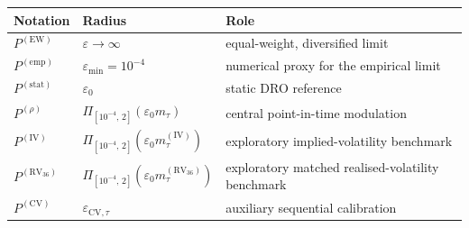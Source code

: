 \begin{tabular}{lll}
\toprule
Notation & Radius & Role \\
\midrule
\(P^{(\mathrm{EW})}\)
  & \(\varepsilon \to \infty\)
  & equal-weight, diversified limit \\

\(P^{(\mathrm{emp})}\)
  & \(\varepsilon_{\min}=10^{-4}\)
  & numerical proxy for the empirical limit \\

\(P^{(\mathrm{stat})}\)
  & \(\varepsilon_0\)
  & static DRO reference \\

\(P^{(\rho)}\)
  & \(\Pi_{[10^{-4},\,2]}(\varepsilon_0 m_\tau)\)
  & central point-in-time modulation \\
  
\(P^{(\mathrm{IV})}\)
  & \(\Pi_{[10^{-4},\,2]}(\varepsilon_0 m_\tau^{(\mathrm{IV})})\)
  & exploratory implied-volatility benchmark \\

\(P^{(\mathrm{RV}_{36})}\)
  & \(\Pi_{[10^{-4},\,2]}(\varepsilon_0 m_\tau^{(\mathrm{RV}_{36})})\)
  & exploratory matched realised-volatility benchmark \\

\(P^{(\mathrm{CV})}\)
  & \(\varepsilon_{\mathrm{CV},\tau}\)
  & auxiliary sequential calibration \\
\bottomrule
\end{tabular}